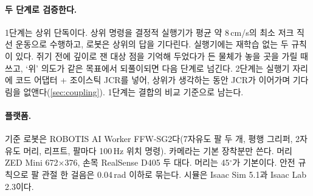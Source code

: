 \paragraph{두 단계로 검증한다.} 1단계는 상위 단독이다. 상위 명령을 결정적 실행기가 평균 약 8\,cm/s의 최소 저크 직선 운동으로 수행하고, 로봇은 상위의 답을 기다린다. 실행기에는 재학습 없는 두 규칙이 있다. 쥐기 전에 깊이로 잰 대상 점을 기억해 두었다가 든 물체가 놓을 곳을 가릴 때 쓰고, `위' 의도가 같은 목표에서 되풀이되면 다음 단계로 넘긴다. 2단계는 실행기 자리에 코드 어댑터 + 조이스틱 JCR를 넣어, 상위가 생각하는 동안 JCR가 이어가며 기다림을 없앤다(\cref{sec:coupling}). 1단계는 결합의 비교 기준으로 남는다.

\paragraph{플랫폼.} 기준 로봇은 ROBOTIS AI Worker FFW-SG2다(7자유도 팔 두 개, 평행 그리퍼, 2자유도 머리, 리프트, 팔마다 100\,Hz 위치 명령). 카메라는 기본 장착분만 쓴다. 머리 ZED Mini 672$\times$376, 손목 RealSense D405 두 대다. 머리는 45$^\circ$가 기본이다. 안전 규칙으로 팔 관절 한 걸음은 0.04\,rad 이하로 묶는다. 시뮬은 Isaac Sim 5.1과 Isaac Lab 2.3이다.
